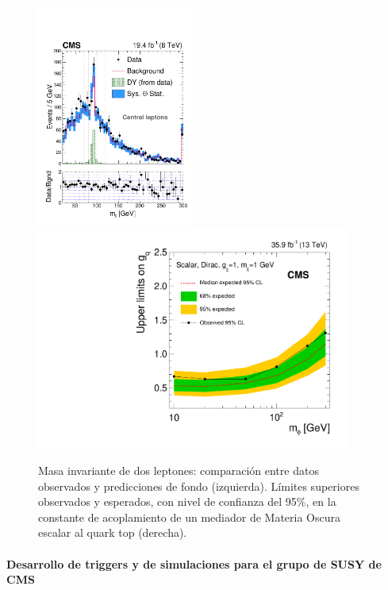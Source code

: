 \begin{figure}[ht]
\centering
\includegraphics[height=7.3cm]{fig/CNC_CE.pdf}
\includegraphics[height=7.3cm]{fig/CMS-EXO-16-049_Figure_003-a.pdf}
\caption{Masa invariante de dos leptones: comparación entre datos observados y predicciones de fondo (izquierda). Límites superiores observados y esperados, con nivel de confianza del 95\%, en la constante de acoplamiento de un mediador de Materia Oscura escalar al quark top (derecha).} 
\label{fig:edge}
\end{figure} 



\paragraph{Desarrollo de triggers y de simulaciones para el grupo de SUSY de CMS\\\\}

